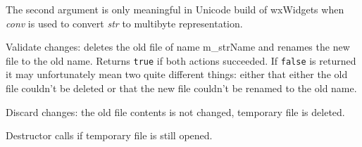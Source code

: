 The second argument is only meaningful in Unicode build of wxWidgets when
{\it conv} is used to convert {\it str} to multibyte representation.

\label{wxtempfilecommit}


Validate changes: deletes the old file of name m\_strName and renames the new
file to the old name. Returns {\tt true} if both actions succeeded. If {\tt false} is
returned it may unfortunately mean two quite different things: either that
either the old file couldn't be deleted or that the new file couldn't be renamed
to the old name.

\label{wxtempfilediscard}


Discard changes: the old file contents is not changed, temporary file is
deleted.

\label{wxtempfiledtor}


Destructor calls  if temporary file
is still opened.

